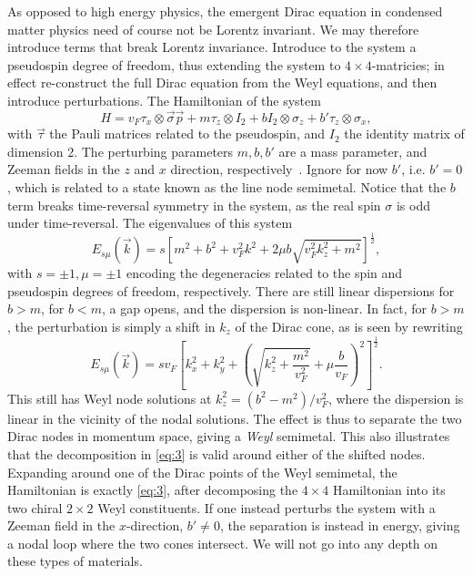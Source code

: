 As opposed to high energy physics, the emergent Dirac equation in condensed matter physics need of course not be Lorentz invariant.
We may therefore introduce terms that break Lorentz invariance.
Introduce to the system a pseudospin degree of freedom, thus extending the system to $4\times 4$-matricies;
in effect re-construct the full Dirac equation from the Weyl equations, and then introduce perturbations.
The Hamiltonian of the system
\begin{equation}
  \label{eq:5}
  H = v_F \tau _x \otimes \vec{\sigma} \vec{p} + m \tau _z \otimes I_2 + b I_2 \otimes \sigma _z + b' \tau _z \otimes \sigma _x,
\end{equation}
with $\vec{\tau}$ the Pauli matrices related to the pseudospin, and $I_2$ the identity matrix of dimension 2.
The perturbing parameters $m, b, b'$ are a mass parameter, and Zeeman fields in the $z$ and $x$ direction, respectively~\cite{armitageWeylDiracSemimetals2018}.
Ignore for now $b'$, i.e. $b' = 0$, which is related to a state known as the line node semimetal.
Notice that the $b$ term breaks time-reversal symmetry in the system, as the real spin $\sigma $ is odd under time-reversal.
The eigenvalues of this system~\cite{armitageWeylDiracSemimetals2018}
\begin{equation}
  E_{s \mu }(\vec{k}) = s \left[
    m^2 + b^2 + v_{F}^2k^2 + 2 \mu  b \sqrt{v_F^2 k_z^2 + m^2}
  \right]^{\frac{1}{2}},
\end{equation}
with $s=\pm 1, \mu = \pm 1$ encoding the degeneracies related to the spin and pseudospin degrees of freedom, respectively.
There are still linear dispersions for $b > m$, for $b < m$, a gap opens, and the dispersion is non-linear.
In fact, for \( b > m \), the perturbation is simply a shift in $k_z$ of the Dirac cone, as  is seen by rewriting
\begin{equation}
  E_{s \mu }(\vec{k}) = s v_F
  \left[
    k_x^2 + k_y^2 + \left( \sqrt{k_z^2 +  \frac{m^2}{v_{F}^2}} + \mu \frac{b}{v_{F}} \right)^2
  \right]^{\frac{1}{2}}.
\end{equation}
This still has Weyl node solutions at $k_z^2 = (b^2-m^2) /v_F^2$, where the dispersion is linear in the vicinity of the nodal solutions.
The effect is thus to separate the two Dirac nodes in momentum space, giving a \emph{Weyl} semimetal.
This also illustrates that the decomposition in \cref{eq:3} is valid around either of the shifted nodes.
Expanding around one of the Dirac points of the Weyl semimetal, the Hamiltonian is exactly \cref{eq:3}, after decomposing the $4 \times 4$ Hamiltonian into its two chiral  $2\times 2$ Weyl constituents.
If one instead perturbs the system with a Zeeman field in the $x$-direction, $b' \neq 0$, the separation is instead in energy, giving a nodal loop where the two cones intersect.
We will not go into any depth on these types of materials.

